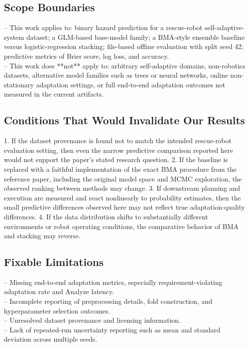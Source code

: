 \documentclass[11pt,a4paper]{article}
\begin{document}
\subsection{Scope Boundaries}
\noindent -- This work applies to: binary hazard prediction for a rescue-robot self-adaptive-system dataset; a GLM-based base-model family; a BMA-style ensemble baseline versus logistic-regression stacking; file-based offline evaluation with split seed 42; predictive metrics of Brier score, log loss, and accuracy.\\
\noindent -- This work does **not** apply to: arbitrary self-adaptive domains, non-robotics datasets, alternative model families such as trees or neural networks, online non-stationary adaptation settings, or full end-to-end adaptation outcomes not measured in the current artifacts.\\


\subsection{Conditions That Would Invalidate Our Results}
1. If the dataset provenance is found not to match the intended rescue-robot evaluation setting, then even the narrow predictive comparison reported here would not support the paper’s stated research question.
2. If the baseline is replaced with a faithful implementation of the exact BMA procedure from the reference paper, including the original model space and MCMC exploration, the observed ranking between methods may change.
3. If downstream planning and execution are measured and react nonlinearly to probability estimates, then the small predictive differences observed here may not reflect true adaptation-quality differences.
4. If the data distribution shifts to substantially different environments or robot operating conditions, the comparative behavior of BMA and stacking may reverse.


\subsection{Fixable Limitations}
\noindent -- Missing end-to-end adaptation metrics, especially requirement-violating adaptation rate and Analyze latency.\\
\noindent -- Incomplete reporting of preprocessing details, fold construction, and hyperparameter selection outcomes.\\
\noindent -- Unresolved dataset provenance and licensing information.\\
\noindent -- Lack of repeated-run uncertainty reporting such as mean and standard deviation across multiple seeds.\\
\end{document}
